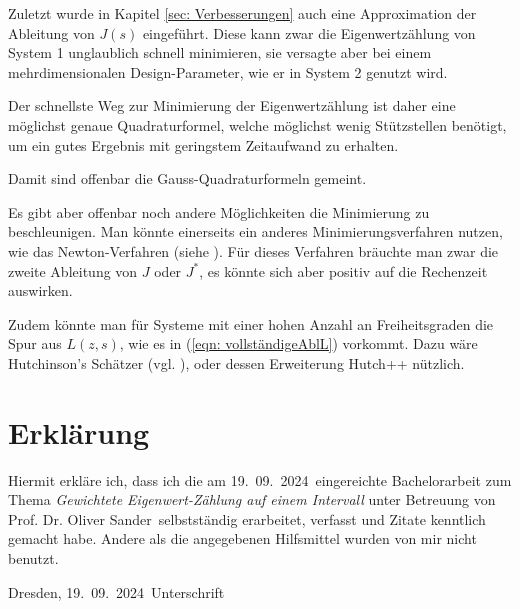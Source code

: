 \documentclass[a4paper,12pt]{report}
\newcommand{\betreuer}{Prof. Dr. Oliver Sander}
\newcommand{\thema}{Gewichtete Eigenwert-Zählung auf einem Intervall}
\newcommand{\datum}{19.\ 09.\ 2024} %
\newcommand{\zitat}[1]{\glqq #1\grqq}
\newcommand{\1}{\mathds{1}}
\theoremstyle{plain} %
\theoremstyle{definition} %
\theoremstyle{remark}
\begin{document}
      Zuletzt wurde in Kapitel \ref{sec: Verbesserungen} auch eine Approximation der Ableitung von $J(s)$ eingeführt. Diese kann zwar die Eigenwertzählung von System 1 unglaublich schnell minimieren, sie versagte aber bei einem mehrdimensionalen Design-Parameter, wie er in System 2 genutzt wird.

      Der schnellste Weg zur Minimierung der Eigenwertzählung ist daher eine möglichst genaue Quadraturformel, welche möglichst wenig Stützstellen benötigt, um ein gutes Ergebnis mit geringstem Zeitaufwand zu erhalten.

      Damit sind offenbar die Gauss-Quadraturformeln gemeint.

      Es gibt aber offenbar noch andere Möglichkeiten die Minimierung zu beschleunigen.
      Man könnte einerseits ein anderes Minimierungsverfahren nutzen, wie das Newton-Verfahren (siehe \cite[S. 290]{optimierungBurkhard}).
      Für dieses Verfahren bräuchte man zwar die zweite Ableitung von $J$ oder $J^*$, es könnte sich aber positiv auf die Rechenzeit auswirken.

      Zudem könnte man für Systeme mit einer hohen Anzahl an Freiheitsgraden die Spur aus $L(z,s)$, wie es in (\ref{eqn: vollständigeAblL}) vorkommt.
      Dazu wäre Hutchinson's Schätzer (vgl. \cite[S. 142]{hutch++Meyer}), oder dessen Erweiterung \zitat{Hutch++}\cite[S. 142]{hutch++Meyer} nützlich.


\printbibliography

\listoffigures
\chapter*{Erkl\"{a}rung}
\thispagestyle{empty}
Hiermit erkl\"{a}re ich, dass ich die am \datum\ eingereichte Bachelorarbeit zum Thema
\emph{\thema} unter Betreuung von \betreuer\ selbstst\"{a}ndig erarbeitet,
verfasst und Zitate kenntlich gemacht habe. Andere als die angegebenen Hilfsmittel
wurden von mir nicht benutzt.

\bigskip \bigskip \bigskip \bigskip \bigskip

Dresden, \datum\ \hfill Unterschrift

\normalsize
\end{document}
